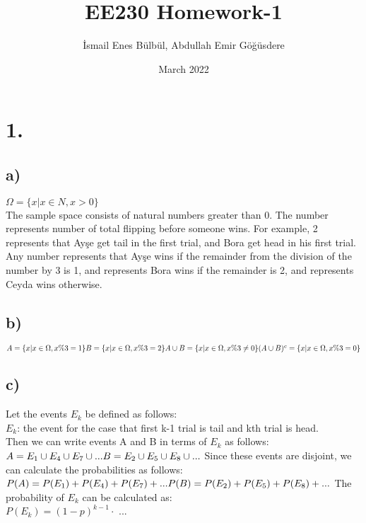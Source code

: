 \documentclass{article}
\title{EE230 Homework-1}
\author{İsmail Enes Bülbül, Abdullah Emir Göğüsdere}
\date{March 2022}
\begin{document}
\maketitle
    \section*{1.}
    \subsection*{a)}
    \begin{math}
        \Omega = \{ x | x \in N, x > 0 \} 
    \end{math}
    \\
    The sample space consists of natural numbers greater than 0.
    The number represents number of total flipping before someone wins.
    For example, 2 represents that Ayşe get tail in the first trial,
    and Bora get head in his first trial.
    Any number represents that Ayşe wins if the remainder from the
    division of the number by 3 is 1, and represents Bora wins if
    the remainder is 2, and represents Ceyda wins otherwise.
    \subsection*{b)}
    \begin{math}
        A = \{ x | x \in \Omega, x  \% 3 = 1 \} \\
        B = \{ x | x \in \Omega, x  \% 3 = 2 \} \\
        A\cup B = \{ x | x \in \Omega, x  \% 3 \neq 0 \} \\
        (A\cup B)^c = \{ x | x \in \Omega, x  \% 3 = 0 \} \\
    \end{math}
    \subsection*{c)}
    Let the events \(E_k\) be defined as follows:\\
    \(E_k\): the event for the case that first k-1 trial is tail and kth trial is head.\\
    Then we can write events A and B in terms of \(E_k\) as follows:\\
    \begin{math}
        A = E_1 \cup E_4 \cup E_7 \cup ...\\
        B = E_2 \cup E_5 \cup E_8 \cup ...\\
    \end{math}
    Since these events are disjoint, we can calculate the probabilities as follows:
    \begin{math}
        P(A) = P(E_1) + P(E_4) + P(E_7) + ...\\
        P(B) = P(E_2) + P(E_5) + P(E_8) + ...\\
    \end{math}
    The probability of \(E_k\) can be calculated as:\\
    \begin{math}
        P(E_k) = (1-p)^{k-1}\cdot 
    \end{math}
    ...\\
\end{document}
